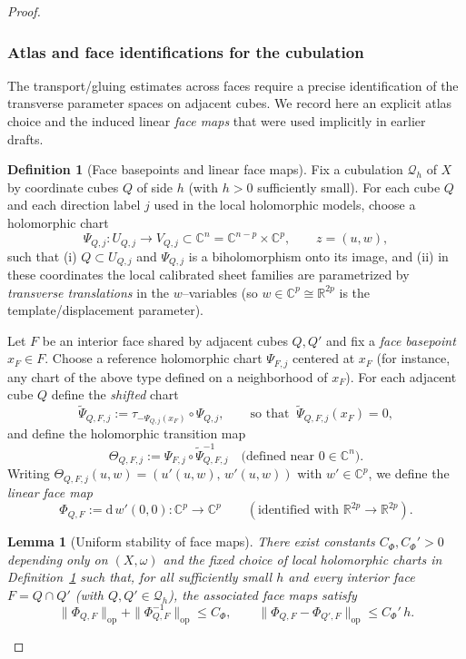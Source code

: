 \documentclass[11pt]{article}
\numberwithin{equation}{section}  %
\theoremstyle{plain}
\newtheorem{lemma}[theorem]{Lemma}
\theoremstyle{definition}
\newtheorem{definition}[theorem]{Definition}
\theoremstyle{remark}
\newcommand{\R}{\mathbb{R}}
\newcommand{\C}{\mathbb{C}}
\begin{document}
\begin{proof}
\subsubsection*{Atlas and face identifications for the cubulation}
\label{sec:atlas-face-identifications}

{The transport/gluing estimates across faces require a precise identification of the transverse
parameter spaces on adjacent cubes. We record here an explicit atlas choice and the induced linear
\emph{face maps} that were used implicitly in earlier drafts.}

\begin{definition}[Face basepoints and linear face maps]
\label{def:face-maps}
Fix a cubulation $\mathcal{Q}_h$ of $X$ by coordinate cubes $Q$ of side $h$ (with $h>0$ sufficiently small).
For each cube $Q$ and each direction label $j$ used in the local holomorphic models,
choose a holomorphic chart
\[
\Psi_{Q,j}\colon U_{Q,j}\longrightarrow V_{Q,j}\subset \C^n=\C^{n-p}\times \C^p,
\qquad z=(u,w),
\]
such that (i) $Q\subset U_{Q,j}$ and $\Psi_{Q,j}$ is a biholomorphism onto its image, and (ii) in these
coordinates the local calibrated sheet families are parametrized by \emph{transverse translations} in the
$w$--variables (so $w\in\C^p\cong \R^{2p}$ is the template/displacement parameter).

Let $F$ be an interior face shared by adjacent cubes $Q,Q'$ and fix a \emph{face basepoint} $x_F\in F$.
Choose a reference holomorphic chart $\Psi_{F,j}$ centered at $x_F$ (for instance, any chart of the above
type defined on a neighborhood of $x_F$).
For each adjacent cube $Q$ define the \emph{shifted} chart
\[
\widetilde\Psi_{Q,F,j}:=\tau_{-\Psi_{Q,j}(x_F)}\circ \Psi_{Q,j},
\qquad\text{so that }\ \widetilde\Psi_{Q,F,j}(x_F)=0,
\]
and define the holomorphic transition map
\[
\Theta_{Q,F,j}:=\Psi_{F,j}\circ \widetilde\Psi_{Q,F,j}^{-1}
\quad\text{(defined near $0\in\C^n$).}
\]
Writing $\Theta_{Q,F,j}(u,w)=(u'(u,w),\,w'(u,w))$ with $w'\in \C^p$, we define the
\emph{linear face map}
\[
\Phi_{Q,F}:=\mathrm{d}\,w'(0,0)\colon \C^p\to \C^p
\qquad(\text{identified with } \R^{2p}\to \R^{2p}).
\]
\end{definition}

\begin{lemma}[Uniform stability of face maps]
\label{lem:face-map-stability}
There exist constants $C_\Phi,C_\Phi'>0$ depending only on $(X,\omega)$ and the fixed choice of local
holomorphic charts in Definition~\ref{def:face-maps} such that, for all sufficiently small $h$ and every
interior face $F=Q\cap Q'$ (with $Q,Q'\in\mathcal{Q}_h$), the associated face maps satisfy
\[
\|\Phi_{Q,F}\|_{\mathrm{op}}+\|\Phi_{Q,F}^{-1}\|_{\mathrm{op}}\le C_\Phi,
\qquad
\|\Phi_{Q,F}-\Phi_{Q',F}\|_{\mathrm{op}}\le C_\Phi'\,h.
\]
\end{lemma}


\end{proof}
\end{document}

